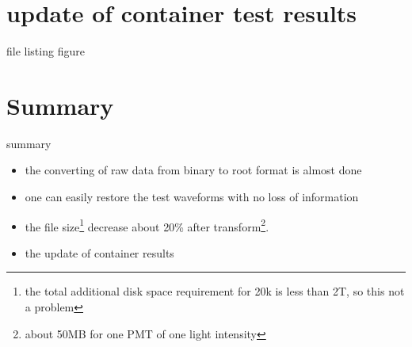 %
\section{update of container test results}
\begin{frame}{file}
listing
figure
\end{frame}
\section{Summary}

\begin{frame}{summary}
\begin{itemize}
\item the converting of raw data from binary to root format is almost done  
\item one can easily restore the test waveforms with no loss of information
\item  the file size\footnote{the total additional disk space requirement for 20k is less than 2T, so this not a problem} decrease about 20\% after transform\footnote{about 50MB for one PMT of one light intensity}.
\item the update of container results
\end{itemize}
\end{frame}

